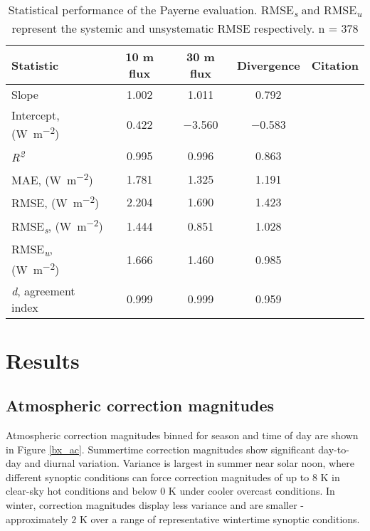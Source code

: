 \begin{bibunit}
\begin{table}[H]
	\centering
	\caption{Statistical performance of the Payerne evaluation. RMSE\textit{\textsubscript{s}} and RMSE\textit{\textsubscript{u}} represent the systemic and unsystematic RMSE respectively. n = 378}
	\label{evalstats}
	\begin{tabular*}{\textwidth}{l@{\extracolsep{\fill}} cccr}
		\toprule 
		Statistic & 10 \si{\meter} flux & 30 \si{\meter} flux & Divergence & Citation \\  \midrule
		Slope & 1.002 & 1.011 & 0.792 &  \\ 
		Intercept, (\si{\watt\per\meter\squared}) & 0.422 & $-$3.560 & $-$0.583 &   \\ 
		\textit{R\textsuperscript{2}} & 0.995 & 0.996 & 0.863 & \\ 
		MAE,  (\si{\watt\per\meter\squared}) & 1.781 & 1.325 & 1.191 & \citep{Willmott1985a} \\ 
		RMSE,  (\si{\watt\per\meter\squared}) & 2.204 & 1.690 & 1.423 & \citep{Willmott1985a} \\ 
		RMSE\textit{\textsubscript{s}},  (\si{\watt\per\meter\squared}) & 1.444 & 0.851 & 1.028 & \citep{Willmott1985a} \\ 
		RMSE\textit{\textsubscript{u}},  (\si{\watt\per\meter\squared}) & 1.666 & 1.460 & 0.985 & \citep{Willmott1985a} \\ 
		\textit{d}, agreement index & 0.999 & 0.999 & 0.959 & \citep{Willmott2012} \\
		\bottomrule
	\end{tabular*} 
\end{table}

\section{Results}

\subsection{Atmospheric correction magnitudes}

Atmospheric correction magnitudes binned for season and time of day are shown in Figure \ref{bx_ac}. Summertime correction magnitudes show significant day-to-day and diurnal variation. Variance is largest in summer near solar noon, where different synoptic conditions can force correction magnitudes of up to $8$ \si{\kelvin} in clear-sky hot conditions and below $0$ \si{\kelvin} under cooler overcast conditions. In winter, correction magnitudes display less variance and are smaller - approximately $2$ \si{\kelvin} over a range of representative wintertime synoptic conditions. 


\end{bibunit}
